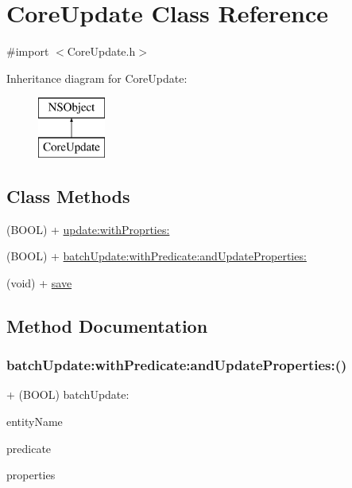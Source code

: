 \hypertarget{interface_core_update}{}\section{Core\+Update Class Reference}
\label{interface_core_update}


{\ttfamily \#import $<$Core\+Update.\+h$>$}

Inheritance diagram for Core\+Update\+:\begin{figure}[H]
\begin{center}
\leavevmode
\includegraphics[height=2.000000cm]{interface_core_update}
\end{center}
\end{figure}
\subsection*{Class Methods}
\begin{DoxyCompactItemize}
\item 
(B\+O\+OL) + \hyperlink{interface_core_update_ab758dbe726d1c446eec56ec907c305f8}{update\+:with\+Proprties\+:}
\item 
(B\+O\+OL) + \hyperlink{interface_core_update_aa12a90493c5abbb8bdcd60508680ce27}{batch\+Update\+:with\+Predicate\+:and\+Update\+Properties\+:}
\item 
(void) + \hyperlink{interface_core_update_a8da508a5087e88765db53b61ccb56741}{save}
\end{DoxyCompactItemize}


\subsection{Method Documentation}
\hypertarget{interface_core_update_aa12a90493c5abbb8bdcd60508680ce27}{}\label{interface_core_update_aa12a90493c5abbb8bdcd60508680ce27} 
\subsubsection{\texorpdfstring{batch\+Update\+:with\+Predicate\+:and\+Update\+Properties\+:()}{batchUpdate:withPredicate:andUpdateProperties:()}}
{\footnotesize\ttfamily + (B\+O\+OL) batch\+Update\+: \begin{DoxyParamCaption}\item[{(N\+S\+String $\ast$)}]{entity\+Name }\item[{withPredicate:(N\+S\+Predicate $\ast$)}]{predicate }\item[{andUpdateProperties:(N\+S\+Dictionary $\ast$)}]{properties }\end{DoxyParamCaption}}

